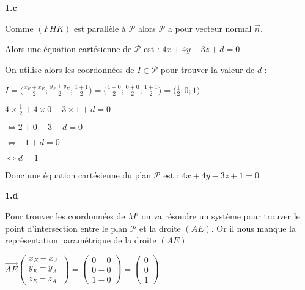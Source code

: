 \documentclass{article}
\begin{document}
\vspace{2mm}

\textbf{1.c}

\vspace{2mm}

\noindent Comme $(FHK)$ est parallèle à $\mathscr{P}$ alors $\mathscr{P}$ a pour vecteur normal $\overrightarrow{n}$.

\noindent Alors une équation cartésienne de $\mathscr{P}$ est : $4x + 4y - 3z + d = 0$

\vspace{2mm}

\noindent On utilise alors les coordonnées de $I \in \mathscr{P}$ pour trouver la valeur de $d$ :

\vspace{2mm}

$I = \Bigg(\displaystyle\frac{x_F+x_E}{2}; \frac{y_F+y_E}{2}; \frac{1+1}{2}\Bigg) = \Bigg(\displaystyle\frac{1+0}{2}; \frac{0+0}{2}; \frac{1+1}{2}\Bigg) = \Bigg(\displaystyle\frac{1}{2}; 0; 1\Bigg)$

\vspace{2mm}

$4 \times \displaystyle\frac{1}{2} + 4 \times 0 - 3 \times 1 + d = 0$

$\Leftrightarrow 2 + 0 - 3 + d = 0$

$\Leftrightarrow -1 + d = 0$

$\Leftrightarrow d = 1$

\vspace{2mm}

\noindent Donc une équation cartésienne du plan $\mathscr{P}$ est : $4x + 4y - 3z + 1 = 0$

\vspace{2mm}

\textbf{1.d}

\vspace{2mm}

\noindent Pour trouver les coordonnées de $M'$ on va résoudre un système pour trouver le point d'intersection entre le plan $\mathscr{P}$ et la droite $(AE)$. Or il nous manque la représentation paramétrique de la droite $(AE)$.

\vspace{2mm}

$\overrightarrow{AE}
\begin{pmatrix}
   x_E-x_A\\
   y_E-y_A\\
   z_E-z_A
\end{pmatrix}
=
\begin{pmatrix}
   0-0\\
   0-0\\
   1-0
\end{pmatrix}
= 
\begin{pmatrix}
   0\\
   0\\
   1
\end{pmatrix}
$
\end{document}
